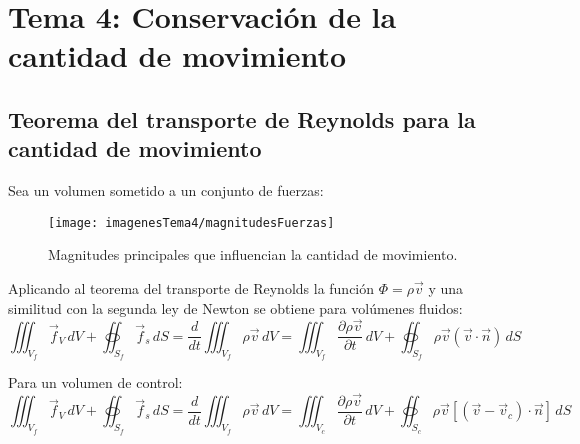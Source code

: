 \section{Tema 4: Conservación de la cantidad de movimiento}
\subsection{Teorema del transporte de Reynolds para la cantidad de movimiento}
Sea un volumen sometido a un conjunto de fuerzas:
\begin{figure}[H]
	\centering
	\texttt{[image: imagenesTema4/magnitudesFuerzas]}
	\caption{Magnitudes principales que influencian la cantidad de movimiento.}
	\label{fig:magnitudesfuerzas}
\end{figure}

Aplicando al teorema del transporte de Reynolds la función $\Phi=\rho\vec{v}$ y una similitud con la segunda ley de Newton se obtiene para volúmenes fluidos:
\[\iiint_{V_f}\vec{f}_V\,dV+\oiint_{S_f}\vec{f}_s\,dS=
\frac{d}{dt}\iiint_{V_f}\rho\vec{v}\,dV=
\iiint_{V_f}\frac{\partial \rho\vec{v}}{\partial t}\,dV+\oiint_{S_f}\rho\vec{v}\left(\vec{v}\cdot\vec{n}\right)\,dS\]

Para un volumen de control:
\[\iiint_{V_f}\vec{f}_V\,dV+\oiint_{S_f}\vec{f}_s\,dS=
\frac{d}{dt}\iiint_{V_f}\rho\vec{v}\,dV=
\iiint_{V_c}\frac{\partial \rho\vec{v}}{\partial t}\,dV
+\oiint_{S_c}\rho\vec{v}\left[\left(\vec{v}-\vec{v}_c\right)\cdot\vec{n}\right]\,dS\]

